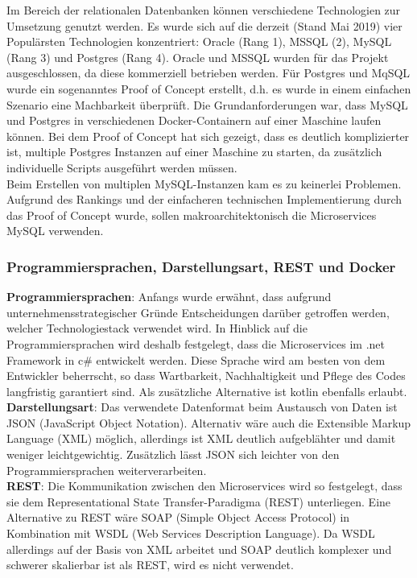 {Im Bereich der relationalen Datenbanken können verschiedene Technologien zur Umsetzung genutzt werden. Es wurde sich auf die derzeit (Stand Mai 2019) vier Populärsten Technologien konzentriert: Oracle (Rang 1), MSSQL (2), MySQL (Rang 3) und Postgres (Rang 4).\cite{dbengines2019ranking}  Oracle und MSSQL wurden für das Projekt ausgeschlossen, da diese kommerziell betrieben werden. Für Postgres und MqSQL wurde ein sogenanntes Proof of Concept erstellt, d.h. es wurde in einem einfachen Szenario eine Machbarkeit überprüft. Die Grundanforderungen war, dass MySQL und Postgres in verschiedenen Docker-Containern auf einer Maschine laufen können. Bei dem Proof of Concept hat sich gezeigt, dass es deutlich komplizierter ist, multiple Postgres Instanzen auf einer Maschine zu starten, da zusätzlich individuelle Scripts ausgeführt werden müssen.\cite{postgres2016}\\

Beim Erstellen von multiplen MySQL-Instanzen kam es zu keinerlei Problemen. Aufgrund des Rankings und der einfacheren technischen Implementierung durch das Proof of Concept wurde, sollen makroarchitektonisch die Microservices MySQL verwenden.

\subsubsection{Programmiersprachen, Darstellungsart, REST und Docker}
\textbf{Programmiersprachen}: Anfangs wurde erwähnt, dass aufgrund unternehmensstrategischer Gründe Entscheidungen darüber getroffen werden, welcher Technologiestack verwendet wird. In Hinblick auf die Programmiersprachen wird deshalb festgelegt, dass die Microservices im .net Framework in c\# entwickelt werden. Diese Sprache wird am besten von dem Entwickler beherrscht, so dass Wartbarkeit, Nachhaltigkeit und Pflege des Codes langfristig garantiert sind. Als zusätzliche Alternative ist kotlin ebenfalls erlaubt.\\

\textbf{Darstellungsart}: Das verwendete Datenformat beim Austausch von Daten ist JSON (JavaScript Object Notation). Alternativ wäre auch die Extensible Markup Language (XML) möglich, allerdings ist XML deutlich aufgeblähter und damit weniger leichtgewichtig. Zusätzlich lässt JSON sich leichter von den Programmiersprachen weiterverarbeiten.\cite{jsonxml2006heise}\\

\textbf{REST}: Die Kommunikation zwischen den Microservices wird so festgelegt, dass sie dem Representational State Transfer-Paradigma (REST) unterliegen. Eine Alternative zu REST wäre SOAP (Simple Object Access Protocol) in Kombination mit WSDL (Web Services Description Language). Da WSDL allerdings auf der Basis von XML arbeitet und SOAP deutlich komplexer und schwerer skalierbar ist als REST, wird es nicht verwendet. \cite{ayadi2008rest_vs_soap}\\ 

}
